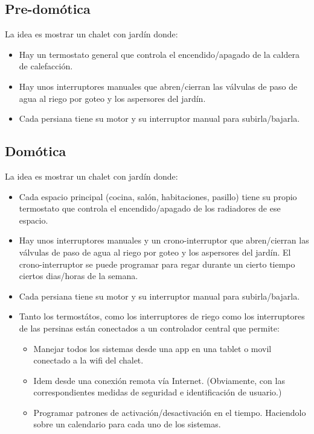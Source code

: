 \documentclass[spanish,10pt,a4paper,final,oneside]{article}
\begin{document}
\subsection{Pre-domótica}

La idea es mostrar un chalet con jardín donde:
\begin{itemize}
\item Hay un termostato general que controla el encendido/apagado de la caldera de calefacción.
\item Hay unos interruptores manuales que abren/cierran las válvulas de paso de agua al riego por goteo y los aspersores del jardín.
\item Cada persiana tiene su motor y su interruptor manual para subirla/bajarla.
\end{itemize}

\subsection{Domótica}

La idea es mostrar un chalet con jardín donde:
\begin{itemize}
\item Cada espacio principal (cocina, salón, habitaciones, pasillo) tiene su propio termostato que controla el encendido/apagado de los radiadores de ese espacio.
\item Hay unos interruptores manuales y un crono-interruptor que abren/cierran las válvulas de paso de agua al riego por goteo y los aspersores del jardín. El crono-interruptor se puede programar para regar durante un cierto tiempo ciertos dias/horas de la semana.
\item Cada persiana tiene su motor y su interruptor manual para subirla/bajarla.
\item Tanto los termostátos, como los interruptores de riego como los interruptores de las persinas están conectados a un controlador central que permite:
\begin{itemize}
\item Manejar todos los sistemas desde una app en una tablet o movil conectado a la wifi del chalet.
\item Idem desde una conexión remota vía Internet. (Obviamente, con las correspondientes medidas de seguridad e identificación de usuario.)
\item Programar patrones de activación/desactivación en el tiempo. Haciendolo sobre un calendario para cada uno de los sistemas.
\end{itemize}
\end{itemize}
\end{document}
